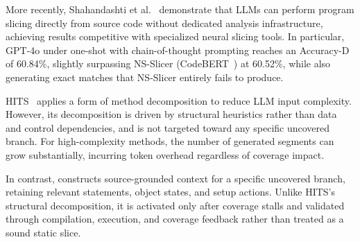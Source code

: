 More recently, Shahandashti et al.~\cite{shahandashti2024programslicingeralarge} demonstrate that LLMs can perform program slicing directly from source code without dedicated analysis infrastructure, achieving results competitive with specialized neural slicing tools. In particular, GPT-4o under one-shot with chain-of-thought prompting reaches an Accuracy-D of 60.84\%, slightly surpassing NS-Slicer (CodeBERT~\cite{feng2020codebert}) at 60.52\%, while also generating exact matches that NS-Slicer entirely fails to produce.

HITS~\cite{wang2024c} applies a form of method decomposition to reduce LLM input complexity. However, its decomposition is driven by structural heuristics rather than data and control dependencies, and is not targeted toward any specific uncovered branch. For high-complexity methods, the number of generated segments can grow substantially, incurring token overhead regardless of coverage impact.

In contrast, \ourmethod{} constructs source-grounded context for a specific uncovered branch, retaining relevant statements, object states, and setup actions. Unlike HITS's structural decomposition, it is activated only after coverage stalls and validated through compilation, execution, and coverage feedback rather than treated as a sound static slice.
